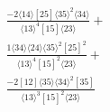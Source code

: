\documentclass[varwidth, border=5pt]{standalone}
\begin{document}
\begin{my}
$\begin{gathered}
\scriptscriptstyle\frac{-2⟨14⟩[25]⟨35⟩^2⟨34⟩}{⟨13⟩^4[15]⟨23⟩}+\\
\scriptscriptstyle\frac{1⟨34⟩⟨24⟩⟨35⟩^2[25]^2}{⟨13⟩^4[15]^2⟨23⟩}+\\
\scriptscriptstyle\frac{-2[12]⟨35⟩⟨34⟩^2[35]}{⟨13⟩^3[15]^2⟨23⟩}\phantom{+}
\end{gathered}$
\end{my}
\end{document}
